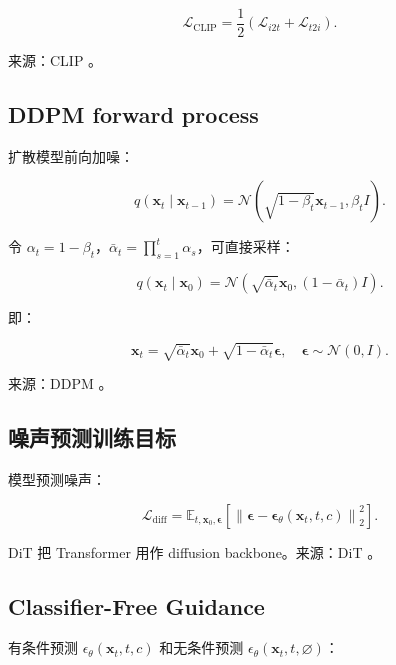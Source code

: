 \documentclass[UTF8,12pt]{ctexart}
\newcommand{\E}{\mathbb{E}}
\newcommand{\1}{\mathbf{1}}
\begin{document}
\begin{equation}
\mathcal{L}_{\mathrm{CLIP}}
=\frac{1}{2}(\mathcal{L}_{i2t}+\mathcal{L}_{t2i}).
\end{equation}

来源：CLIP \cite{radford2021clip}。

\subsection{DDPM forward process}

扩散模型前向加噪：

\begin{equation}
q(\bm{x}_t\mid \bm{x}_{t-1})
=\mathcal{N}(\sqrt{1-\beta_t}\bm{x}_{t-1},\beta_t I).
\end{equation}

令 $\alpha_t=1-\beta_t$，$\bar{\alpha}_t=\prod_{s=1}^{t}\alpha_s$，可直接采样：

\begin{equation}
q(\bm{x}_t\mid \bm{x}_0)
=\mathcal{N}(\sqrt{\bar{\alpha}_t}\bm{x}_0,(1-\bar{\alpha}_t)I).
\end{equation}

即：

\begin{equation}
\bm{x}_t
=\sqrt{\bar{\alpha}_t}\bm{x}_0
+\sqrt{1-\bar{\alpha}_t}\bm{\epsilon},
\quad
\bm{\epsilon}\sim\mathcal{N}(0,I).
\end{equation}

来源：DDPM \cite{ho2020ddpm}。

\subsection{噪声预测训练目标}

模型预测噪声：

\begin{equation}
\mathcal{L}_{\mathrm{diff}}
=\E_{t,\bm{x}_0,\bm{\epsilon}}
\left[
\left\|
\bm{\epsilon}
-\bm{\epsilon}_\theta(\bm{x}_t,t,c)
\right\|_2^2
\right].
\label{eq:diffusion-loss}
\end{equation}

DiT 把 Transformer 用作 diffusion backbone。来源：DiT \cite{peebles2022dit}。

\subsection{Classifier-Free Guidance}

有条件预测 $\epsilon_\theta(\bm{x}_t,t,c)$ 和无条件预测 $\epsilon_\theta(\bm{x}_t,t,\varnothing)$：
\end{document}
